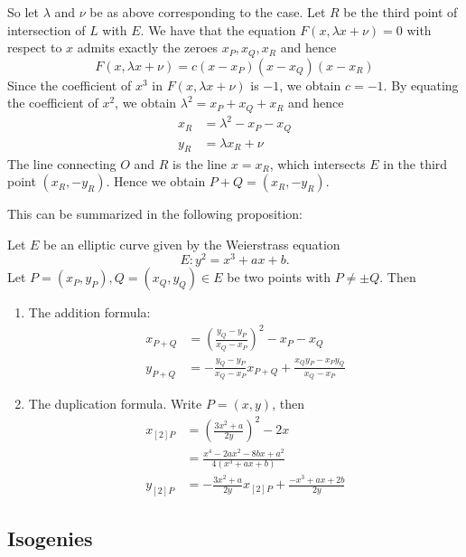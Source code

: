 So let $\lambda$ and $\nu$ be as above corresponding to the case.
Let $R$ be the third point of intersection of $L$ with $E$.
We have that the equation $F(x, \lambda x + \nu) = 0$ with respect to $x$
admits exactly the zeroes $x_P, x_Q, x_R$ and hence
\begin{equation*}
	F(x, \lambda x + \nu) = c(x - x_P)(x - x_Q)(x - x_R)
\end{equation*}
Since the coefficient of $x^3$ in $F(x, \lambda x + \nu)$ is $-1$, we obtain
$c = -1$. By equating the coefficient of $x^2$, we obtain
$\lambda^2 = x_P + x_Q + x_R$ and hence
\begin{align*}
	x_R &= \lambda^2 - x_P - x_Q\\
	y_R &= \lambda x_R + \nu
\end{align*}
The line connecting $O$ and $R$ is the line $x = x_R$, which intersects $E$
in the third point $(x_R, -y_R)$.
Hence we obtain $P + Q = (x_R, -y_R)$.

This can be summarized in the following proposition:
\begin{proposition}
	\label{prop:explicit-equations}
	Let $E$ be an elliptic curve given by the Weierstrass equation
	\begin{equation*}
		E: y^2 = x^3 + ax + b.
	\end{equation*}
	Let $P = (x_P, y_P), Q = (x_Q, y_Q) \in E$ be two points with $P \neq \pm Q$.
	Then 
	\begin{enumerate}
		\item The addition formula:
			\begin{align*}
				x_{P + Q} &= \left( \frac{y_Q - y_P}{x_Q - x_P} \right)^2
				- x_P - x_Q\\
				y_{P + Q} &= -\frac{y_Q - y_P}{x_Q - x_P}x_{P+Q} + \frac{x_Qy_P -
				x_Py_Q}{x_Q - x_P}
			\end{align*}
		\item The duplication formula. Write $P = (x, y)$, then
			\begin{align*}
				x_{[2]P} &= \left( \frac{3x^2 + a}{2y} \right)^2
				- 2x\\
				&= \frac{x^4 - 2ax^2 - 8bx + a^2}{4(x^3 + ax + b)}\\
				y_{[2]P} &= - \frac{3x^2 + a}{2y}x_{[2]P}
				+ \frac{-x^3 + ax + 2b}{2y}
			\end{align*}
	\end{enumerate}
\end{proposition}

\subsection{Isogenies}

